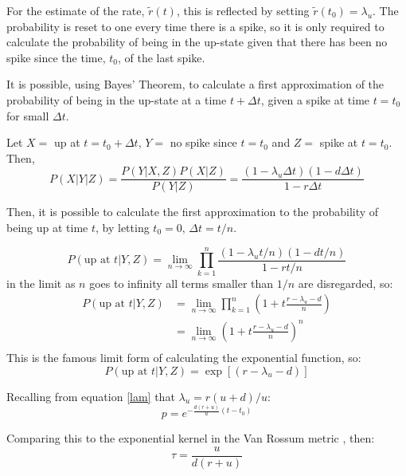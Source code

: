 For the estimate of the rate, $\tilde{r}(t)$, this is reflected by setting $\tilde{r}(t_0) = \lambda_u$.  The probability is reset  to one every time there is a spike, so it is only required to calculate the probability of being in the up-state given that there has been no spike since the time, $t_0$, of the last spike.  

It is possible, using Bayes' Theorem, to calculate a first approximation of the probability of being in the up-state at a time $t+\Delta t$, given a spike at time $t=t_0$ for small $\Delta t$.

 Let $X=$ up at $t=t_0+\Delta t$, $Y=$ no spike since $t=t_0$ and $Z=$ spike at $t=t_0$. Then,
\begin{equation}\label{p}
P(X|Y|Z) = \frac{P(Y|X,Z)P(X|Z)}{P(Y|Z)} = \frac{(1-\lambda_u \Delta t) (1-d \Delta t)}{1-r\Delta t}
\end{equation}

Then, it is possible to calculate the first approximation to the probability  of being up at time $t$, by letting $t_0=0, \,\Delta t =t/n$.

\begin{equation}
P(\mbox{up at } t | Y , Z)   =  \lim_{n \rightarrow \infty}\prod_{k=1}^n \frac{(1-\lambda_ut/n)(1-dt/n)}{1-rt/n}
\end{equation} 
in the limit as $n$ goes to infinity all terms smaller than $1/n$ are disregarded, so:
\begin{equation}
\begin{split}
P(\mbox{up at } t | Y , Z) &= \lim_{n \rightarrow \infty} \prod_{k=1}^n \left(1+ t\frac{r-\lambda_u-d}{n}\right) \\
& = \lim_{n \rightarrow \infty} \left(1 + t\frac{r-\lambda_u -d}{n} \right)^n \\
\end{split}
\end{equation}
This is the famous limit form of calculating the exponential function, so:
\begin{equation}
P(\mbox{up at } t | Y,Z) = \exp [ (r-\lambda_u-d) ]
\end{equation} 

Recalling from equation \ref{lam} that $\lambda_u = r(u+d)/u$:
\begin{equation}
p=e^{-\frac{d(r+u)}{u}(t-t_0)}
\end{equation}

Comparing this to the exponential kernel in the Van Rossum metric \citep{VanRossum2001a}, then:
\begin{equation}
\tau = \frac{u}{d(r+u)}
\end{equation}

